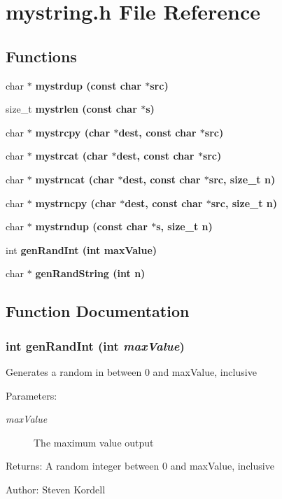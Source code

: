 \section{mystring.h File Reference}
\label{mystring_8h}
\subsection*{Functions}
\begin{CompactItemize}
\item 
char $\ast$ \bf{mystrdup} (const char $\ast$src)
\item 
size\_\-t \bf{mystrlen} (const char $\ast$s)
\item 
char $\ast$ \bf{mystrcpy} (char $\ast$dest, const char $\ast$src)
\item 
char $\ast$ \bf{mystrcat} (char $\ast$dest, const char $\ast$src)
\item 
char $\ast$ \bf{mystrncat} (char $\ast$dest, const char $\ast$src, size\_\-t n)
\item 
char $\ast$ \bf{mystrncpy} (char $\ast$dest, const char $\ast$src, size\_\-t n)
\item 
char $\ast$ \bf{mystrndup} (const char $\ast$s, size\_\-t n)
\item 
int \bf{gen\-Rand\-Int} (int max\-Value)
\item 
char $\ast$ \bf{gen\-Rand\-String} (int n)
\end{CompactItemize}


\subsection{Function Documentation}
\subsubsection{\setlength{\rightskip}{0pt plus 5cm}int gen\-Rand\-Int (int {\em max\-Value})}\label{mystring_8h_c4418fa1a8e694adecb1016209595ae1}


Generates a random in between 0 and max\-Value, inclusive \begin{Desc}
\item[Parameters:]
\begin{description}
\item[{\em max\-Value}]The maximum value output \end{description}
\end{Desc}
\begin{Desc}
\item[Returns:]A random integer between 0 and max\-Value, inclusive \end{Desc}
\begin{Desc}
\item[Author:]Steven Kordell \end{Desc}
